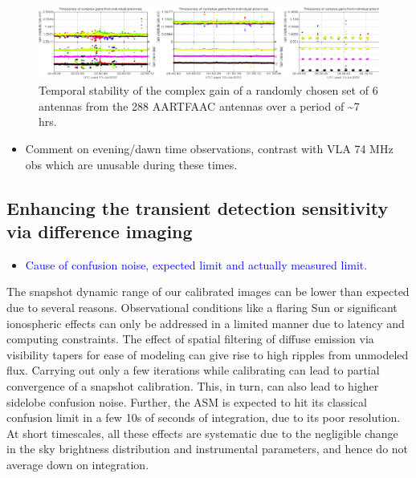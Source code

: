 \documentclass{aa}
\begin{document}
\begin{figure}[tbh]
\includegraphics[width=1\textwidth]{Figs/combined_plot_gains}\caption{\label{fig:gain-Temporal-stability}Temporal stability of the complex
gain of a randomly chosen set of 6 antennas from the 288 AARTFAAC
antennas over a period of \textasciitilde{}7 hrs.}
\end{figure}

\begin{itemize}
\item Comment on evening/dawn time observations, contrast with VLA 74 MHz
obs which are unusable during these times.
\end{itemize}

\subsection{\label{sub:Enhancing-the-transient}Enhancing the transient detection
sensitivity via difference imaging}
\begin{itemize}
\item \textcolor{blue}{Cause of confusion noise, expected limit and actually
measured limit.}
\end{itemize}
The snapshot dynamic range of our calibrated images can be lower than
expected due to several reasons. Observational conditions like a flaring
Sun or significant ionospheric effects can only be addressed in a
limited manner due to latency and computing constraints. The effect
of spatial filtering of diffuse emission via visibility tapers for
ease of modeling can give rise to high ripples from unmodeled flux.
Carrying out only a few iterations while calibrating can lead to partial
convergence of a snapshot calibration. This, in turn, can also lead
to higher sidelobe confusion noise. Further, the ASM is expected to
hit its classical confusion limit in a few 10s of seconds of integration,
due to its poor resolution. At short timescales, all these effects
are systematic due to the negligible change in the sky brightness
distribution and instrumental parameters, and hence do not average
down on integration. 
\end{document}
